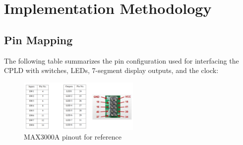\documentclass[10pt,a4paper,twocolumn,twoside]{tau-class/tau}
\begin{document}
\section{Implementation Methodology}

    \subsection{Pin Mapping}
    
    The following table summarizes the pin configuration used for interfacing the CPLD with switches, LEDs, 7-segment display outputs, and the clock:

    \begin{figure}[h!]
        \centering
        \includegraphics[width=0.52\textwidth]{figures/cpld_pinout.png}
        \caption{MAX3000A pinout for reference}
        \label{fig:circuitdiagram}
    \end{figure}
\end{document}
